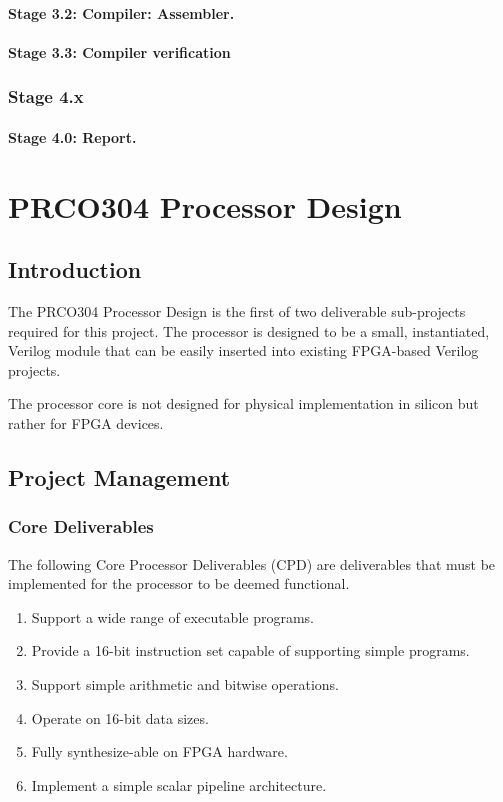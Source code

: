 \documentclass[11pt,a4paper]{report}
\newcommand{\scname}{PRCO304}
\begin{document}
\subsubsection*{Stage 3.2: Compiler: Assembler.}
\subsubsection*{Stage 3.3: Compiler verification}

\subsection*{Stage 4.x}
\subsubsection*{Stage 4.0: Report.}




\chapter{\scname{} Processor Design}
{\hypersetup{linkcolor=black}
\startcontents[chapters]
}


\section{Introduction}
The \scname{} Processor Design is the first of two deliverable sub-projects required for this project. The processor is designed to be a small, instantiated, Verilog module that can be easily inserted into existing FPGA-based Verilog projects.

The processor core is not designed for physical implementation in silicon but rather for FPGA devices.


\newpage
\section{Project Management}

\subsection{Core Deliverables}
The following Core Processor Deliverables (CPD) are deliverables that must be implemented for the processor to be deemed functional.

\begin{enumerate}[label=\bfseries CPD\arabic*.]
\item{Support a wide range of executable programs.}
\item{Provide a 16-bit instruction set capable of supporting simple programs.}
\item{Support simple arithmetic and bitwise operations.}
\item{Operate on 16-bit data sizes.}
\item{Fully synthesize-able on FPGA hardware.}
\item{Implement a simple scalar pipeline architecture.}
\end{enumerate}
\end{document}
